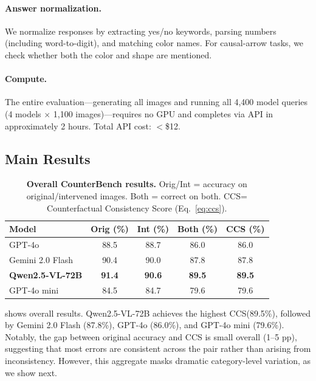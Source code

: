 \documentclass[10pt,twocolumn,letterpaper]{article}
\newcommand{\method}{CounterBench\xspace}
\newcommand{\ccs}{CCS\xspace}
\begin{document}
\paragraph{Answer normalization.} We normalize responses by extracting yes/no keywords, parsing numbers (including word-to-digit), and matching color names. For causal-arrow tasks, we check whether both the color and shape are mentioned.

\paragraph{Compute.} The entire evaluation---generating all images and running all 4,400 model queries (4 models $\times$ 1,100 images)---requires no GPU and completes via API in approximately 2 hours. Total API cost: $<$\$12.

\subsection{Main Results}

\begin{table}[t]
\centering
\caption{\textbf{Overall \method results.} Orig/Int = accuracy on original/intervened images. Both = correct on both. \ccs = Counterfactual Consistency Score (Eq.~\ref{eq:ccs}).}
\label{tab:overall}
\small
\setlength{\tabcolsep}{3.5pt}
\begin{tabular}{@{}lcccc@{}}
\toprule
Model & Orig (\%) & Int (\%) & Both (\%) & \textbf{CCS} (\%) \\
\midrule
GPT-4o & 88.5 & 88.7 & 86.0 & 86.0 \\
Gemini 2.0 Flash & 90.4 & 90.0 & 87.8 & 87.8 \\
\textbf{Qwen2.5-VL-72B} & \textbf{91.4} & \textbf{90.6} & \textbf{89.5} & \textbf{89.5} \\
GPT-4o mini & 84.5 & 84.7 & 79.6 & 79.6 \\
\bottomrule
\end{tabular}
\end{table}

 shows overall results. Qwen2.5-VL-72B achieves the highest \ccs (89.5\%), followed by Gemini 2.0 Flash (87.8\%), GPT-4o (86.0\%), and GPT-4o mini (79.6\%). Notably, the gap between original accuracy and \ccs is small overall (1--5 pp), suggesting that most errors are consistent across the pair rather than arising from inconsistency. However, this aggregate masks dramatic category-level variation, as we show next.
\end{document}
